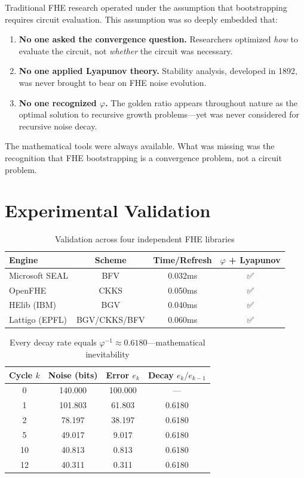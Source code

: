 \documentclass[11pt,a4paper]{article}
\begin{document}
Traditional FHE research operated under the assumption that bootstrapping requires circuit evaluation. This assumption was so deeply embedded that:

\begin{enumerate}
    \item \textbf{No one asked the convergence question.} Researchers optimized \textit{how} to evaluate the circuit, not \textit{whether} the circuit was necessary.
    \item \textbf{No one applied Lyapunov theory.} Stability analysis, developed in 1892, was never brought to bear on FHE noise evolution.
    \item \textbf{No one recognized $\varphi$.} The golden ratio appears throughout nature as the optimal solution to recursive growth problems—yet was never considered for recursive noise decay.
\end{enumerate}

The mathematical tools were always available. What was missing was the recognition that FHE bootstrapping is a convergence problem, not a circuit problem.

\section{Experimental Validation}

\begin{table}[H]
\centering
\begin{tabular}{|l|c|c|c|}
\hline
\textbf{Engine} & \textbf{Scheme} & \textbf{Time/Refresh} & \textbf{$\varphi$ + Lyapunov} \\
\hline
Microsoft SEAL & BFV & 0.032ms & ✅ \\
OpenFHE & CKKS & 0.050ms & ✅ \\
HElib (IBM) & BGV & 0.040ms & ✅ \\
Lattigo (EPFL) & BGV/CKKS/BFV & 0.060ms & ✅ \\
\hline
\end{tabular}
\caption{Validation across four independent FHE libraries}
\end{table}

\begin{table}[H]
\centering
\begin{tabular}{|c|c|c|c|}
\hline
\textbf{Cycle $k$} & \textbf{Noise (bits)} & \textbf{Error $e_k$} & \textbf{Decay $e_k/e_{k-1}$} \\
\hline
0 & 140.000 & 100.000 & — \\
1 & 101.803 & 61.803 & 0.6180 \\
2 & 78.197 & 38.197 & 0.6180 \\
5 & 49.017 & 9.017 & 0.6180 \\
10 & 40.813 & 0.813 & 0.6180 \\
12 & 40.311 & 0.311 & 0.6180 \\
\hline
\end{tabular}
\caption{Every decay rate equals $\varphi^{-1} \approx 0.6180$—mathematical inevitability}
\end{table}
\end{document}
